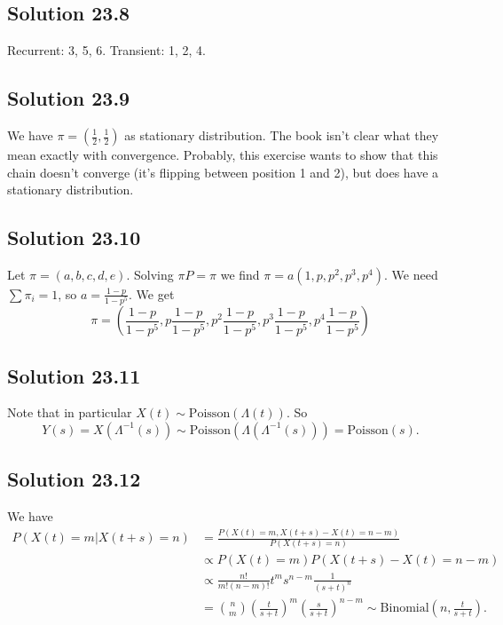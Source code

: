 \subsection*{Solution 23.8}

Recurrent: 3, 5, 6.
Transient: 1, 2, 4.


\subsection*{Solution 23.9}

We have $\pi = (\frac{1}{2}, \frac{1}{2})$ as stationary distribution.
The book isn't clear what they mean exactly with convergence.
Probably, this exercise wants to show that this chain doesn't converge (it's flipping between position 1 and 2), but does have a stationary distribution.


\subsection*{Solution 23.10}

Let $\pi = (a, b, c, d, e)$.
Solving $\pi P = \pi$ we find $\pi = a (1, p, p^2, p^3, p^4)$.
We need $\sum \pi_i = 1$, so $a = \frac{1 - p}{1 - p^5}$.
We get
\begin{equation*}
    \pi = \left(
        \frac{1 - p}{1 - p^5},
        p \frac{1 - p}{1 - p^5},
        p^2 \frac{1 - p}{1 - p^5},
        p^3 \frac{1 - p}{1 - p^5},
        p^4 \frac{1 - p}{1 - p^5}
    \right)
\end{equation*}


\subsection*{Solution 23.11}

Note that in particular $X(t) \sim \mathrm{Poisson}(\Lambda(t))$.
So
\begin{equation*}
    Y(s) = X(\Lambda^{-1}(s)) \sim \mathrm{Poisson}(\Lambda(\Lambda^{-1}(s))) = \mathrm{Poisson}(s).
\end{equation*}


\subsection*{Solution 23.12}

We have
\begin{equation*}
    \begin{split}
        P(X(t) = m | X(t + s) = n)
            &= \frac{P(X(t) = m, X(t + s) - X(t) = n - m)}{P(X(t + s) = n)} \\
            &\propto P(X(t) = m)P(X(t + s) - X(t) = n - m) \\
            &\propto \frac{n!}{m!(n - m)!} t^m s^{n - m} \frac{1}{(s + t)^n} \\
            &= \binom{n}{m} \left(\frac{t}{s + t}\right)^m \left(\frac{s}{s + t}\right)^{n - m}
            \sim \mathrm{Binomial}\left(n, \frac{t}{s + t}\right).
    \end{split}
\end{equation*}


